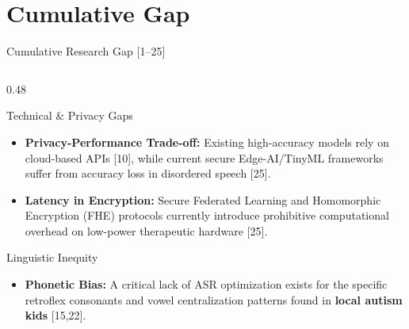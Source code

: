 \documentclass[aspectratio=169, 11pt]{beamer}
\begin{document}
\section{Cumulative Gap}
\begin{frame}{Cumulative Research Gap [1--25]}
    \vspace{-4mm}
    \begin{columns}[T, totalwidth=\textwidth]
        
        \begin{column}{0.48\textwidth}
            \begin{block}{\small Technical \& Privacy Gaps}
                \scriptsize
                \begin{itemize}
                    \item \textbf{Privacy-Performance Trade-off:} Existing high-accuracy models rely on cloud-based APIs [10], while current secure Edge-AI/TinyML frameworks suffer from accuracy loss in disordered speech [25].
                    \item \textbf{Latency in Encryption:} Secure Federated Learning and Homomorphic Encryption (FHE) protocols currently introduce prohibitive computational overhead on low-power therapeutic hardware [25].
                \end{itemize}
            \end{block}
            
            \vspace{2mm}
            
            \begin{block}{\small Linguistic Inequity}
                \scriptsize
                \begin{itemize}
                    \item \textbf{Phonetic Bias:} A critical lack of ASR optimization exists for the specific retroflex consonants and vowel centralization patterns found in \textbf{local autism kids} [15,22].
                \end{itemize}
            \end{block}
        \end{column}


\end{columns}
\end{frame}
\end{document}
